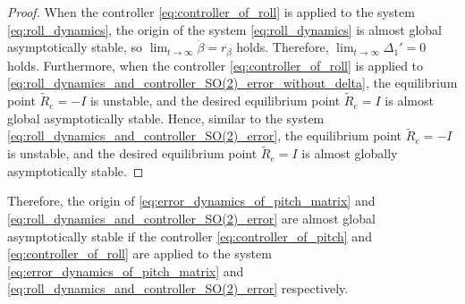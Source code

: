 \begin{proof}
    When the controller \eqref{eq:controller_of_roll} is applied to the system \eqref{eq:roll_dynamics}, the origin of the system \eqref{eq:roll_dynamics} is almost global asymptotically stable, so $ \displaystyle \lim_{t \rightarrow \infty} \dot{\beta} = r_{\beta} $ holds.
    Therefore, $ \displaystyle \lim_{t \rightarrow \infty} \Delta_1' = 0 $ holds.
    Furthermore, when the controller \eqref{eq:controller_of_roll} is applied to  \eqref{eq:roll_dynamics_and_controller_SO(2)_error_without_delta}, the equilibrium point $ \tilde{R}_e = -I $ is unstable, and the desired equilibrium point $ \tilde{R}_e = I $ is almost global asymptotically stable.
    Hence, similar to the system \eqref{eq:roll_dynamics_and_controller_SO(2)_error}, the equilibrium point $ \tilde{R}_e = -I $ is unstable, and the desired equilibrium point $ \tilde{R}_e = I $ is almost globally asymptotically stable.
\end{proof}
Therefore, the origin of \eqref{eq:error_dynamics_of_pitch_matrix} and \eqref{eq:roll_dynamics_and_controller_SO(2)_error} are almost global asymptotically stable if the controller \eqref{eq:controller_of_pitch} and \eqref{eq:controller_of_roll} are applied to the system \eqref{eq:error_dynamics_of_pitch_matrix} and \eqref{eq:roll_dynamics_and_controller_SO(2)_error} respectively.

